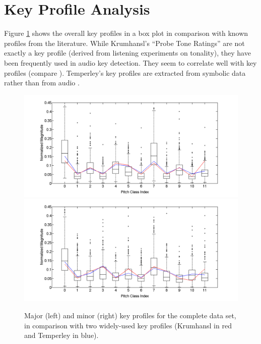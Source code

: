 \documentclass{article}
\begin{document}
\section{Key Profile Analysis}\label{keyprof}
Figure \ref{fig:OverallKeyProfiles} shows the overall key profiles in a box plot in comparison with known profiles from the literature. 
While Krumhansl's ``Probe Tone Ratings'' \cite{krumhansl_cognitive_1990} are not exactly a key profile (derived from listening experiments on tonality), they have been frequently used in audio key detection. They seem to correlate well with key profiles (compare \cite{izmirli_template_2005}). 
Temperley's key profiles are extracted from symbolic data  rather than from audio \cite{temperley_bayesian_2004,temperley_pitch-class_2008}.
\begin{figure}[htb]
\centering
    \includegraphics[scale=.2]{graph/allMajChroma+Krum+Temp}
    \includegraphics[scale=.2]{graph/allMinChroma+Krum+Temp}
	\caption{Major (left) and minor (right) key profiles for the complete data set, in comparison with two widely-used key profiles (Krumhansl in red and Temperley in blue).}
	\label{fig:OverallKeyProfiles}
\end{figure}
\end{document}
